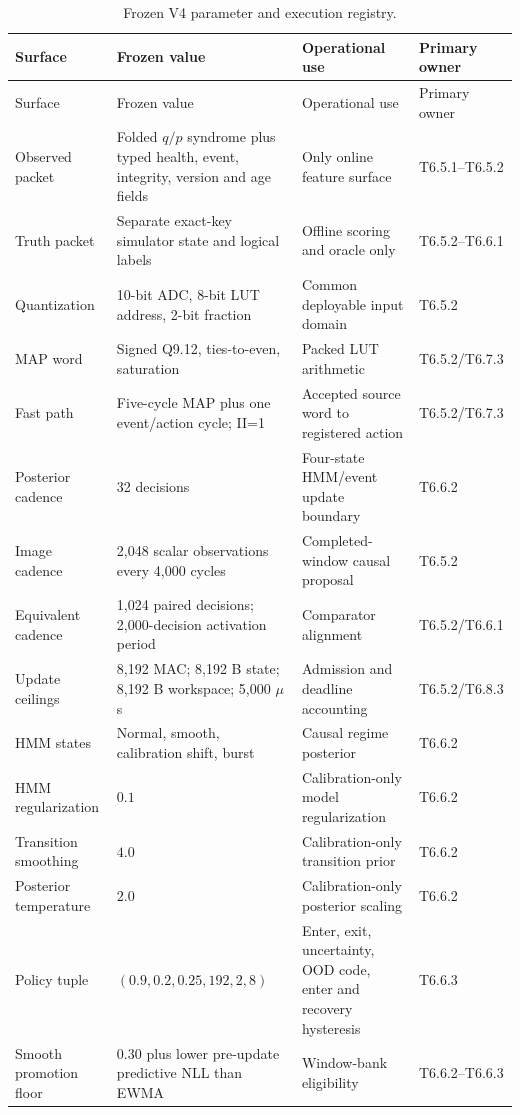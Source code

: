 \documentclass[11pt]{article}
\begin{document}
{\small
\begin{longtable}{@{}L{0.20\textwidth} L{0.25\textwidth} L{0.25\textwidth} L{0.20\textwidth}@{}}
\caption{Frozen V4 parameter and execution registry.}
\label{tab:supp-frozen-parameters}\\
\toprule
Surface & Frozen value & Operational use & Primary owner \\
\midrule
\endfirsthead
\toprule
Surface & Frozen value & Operational use & Primary owner \\
\midrule
\endhead
Observed packet & Folded $q/p$ syndrome plus typed health, event, integrity, version and age fields & Only online feature surface & T6.5.1--T6.5.2 \\
Truth packet & Separate exact-key simulator state and logical labels & Offline scoring and oracle only & T6.5.2--T6.6.1 \\
Quantization & 10-bit ADC, 8-bit LUT address, 2-bit fraction & Common deployable input domain & T6.5.2 \\
MAP word & Signed Q9.12, ties-to-even, saturation & Packed LUT arithmetic & T6.5.2/T6.7.3 \\
Fast path & Five-cycle MAP plus one event/action cycle; II=1 & Accepted source word to registered action & T6.5.2/T6.7.3 \\
Posterior cadence & 32 decisions & Four-state HMM/event update boundary & T6.6.2 \\
Image cadence & 2,048 scalar observations every 4,000 cycles & Completed-window causal proposal & T6.5.2 \\
Equivalent cadence & 1,024 paired decisions; 2,000-decision activation period & Comparator alignment & T6.5.2/T6.6.1 \\
Update ceilings & 8,192 MAC; 8,192 B state; 8,192 B workspace; 5,000 $\mu$s & Admission and deadline accounting & T6.5.2/T6.8.3 \\
HMM states & Normal, smooth, calibration shift, burst & Causal regime posterior & T6.6.2 \\
HMM regularization & $0.1$ & Calibration-only model regularization & T6.6.2 \\
Transition smoothing & $4.0$ & Calibration-only transition prior & T6.6.2 \\
Posterior temperature & $2.0$ & Calibration-only posterior scaling & T6.6.2 \\
Policy tuple & $(0.9,0.2,0.25,192,2,8)$ & Enter, exit, uncertainty, OOD code, enter and recovery hysteresis & T6.6.3 \\
Smooth promotion floor & $0.30$ plus lower pre-update predictive NLL than EWMA & Window-bank eligibility & T6.6.2--T6.6.3 \\

\end{longtable}}
\end{document}
